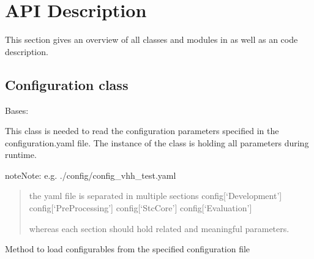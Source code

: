\documentclass[letterpaper,10pt,english,openany,oneside]{sphinxmanual}
\begin{document}
\chapter{API Description}
\label{\detokenize{index:api-description}}
This section gives an overview of all classes and modules in  as well as an code description.


\section{Configuration class}
\label{\detokenize{Configuration:configuration-class}}\label{\detokenize{Configuration::doc}}

\begin{fulllineitems}
\label{\detokenize{Configuration:stc.Configuration.Configuration}}
Bases: 

This class is needed to read the configuration parameters specified in the configuration.yaml file.
The instance of the class is holding all parameters during runtime.

\begin{sphinxadmonition}{note}{Note:}
e.g. ./config/config\_vhh\_test.yaml
\begin{quote}

the yaml file is separated in multiple sections
config{[}‘Development’{]}
config{[}‘PreProcessing’{]}
config{[}‘StcCore’{]}
config{[}‘Evaluation’{]}

whereas each section should hold related and meaningful parameters.
\end{quote}
\end{sphinxadmonition}

\begin{fulllineitems}
\label{\detokenize{Configuration:stc.Configuration.Configuration.loadConfig}}
Method to load configurables from the specified configuration file

\end{fulllineitems}


\end{fulllineitems}
\end{document}
